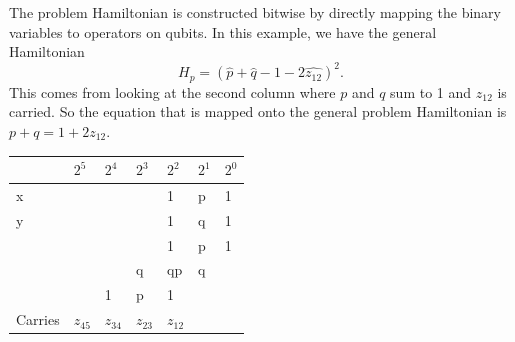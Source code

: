 \documentclass[%
 reprint,
 amsmath,amssymb,
 aps,
]{revtex4-1}
\begin{document}
   The problem Hamiltonian is constructed bitwise by directly mapping the binary variables to operators on qubits\cite{Xu2012}. In this example, we have the general Hamiltonian 
	\begin{equation}	
	H_p = \left( \hat{p} + \hat{q} -1 -2\hat{z_{12}} \right)^2 .
	\end{equation}
This comes from looking at the second column where $p$ and $q$ sum to 1 and $z_{12}$ is carried. So the equation that is mapped onto the general problem Hamiltonian is $p+q=1+2z_{12}$.

\begin{table}[h]
\begin{flushleft}
\begin{tabular}{ p{1.7cm}  p{1cm} p{1cm} p{1cm} p{1cm} p{1cm} p{1cm}} \hline\hline
 & \textit{$2^5$}  & \textit{$2^4$}  & \textit{$2^3$}
& \textit{$2^2$}   & \textit{$2^1$} & \textit{$2^0$} \\ \hline

x &\hspace{0.1cm} &\hspace{0.1cm} &\hspace{0.1cm} &1 &p &1 \\ 

y &\hspace{0.1cm} &\hspace{0.1cm} &\hspace{0.1cm} &1 &q &1 \\ 

\hspace{0.1cm} &\hspace{0.1cm} &\hspace{0.1cm} &\hspace{0.1cm} &1 &p &1 \\ 

\hspace{0.1cm} &\hspace{0.1cm} &\hspace{0.1cm} &q  &qp &q &\hspace{0.1cm} \\ 

\hspace{0.1cm} &\hspace{0.1cm} &1 &p  &1 &\hspace{0.1cm} &\hspace{0.1cm} \\ 

Carries &$z_{45}$ &$z_{34}$ &$z_{23}$ &$z_{12}$ &\hspace{0.1cm} &\hspace{0.1cm} \\ 


\end{tabular}
\end{flushleft}
\end{table}
\end{document}
